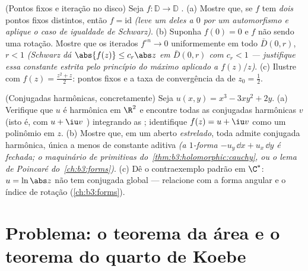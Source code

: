 \begin{exercise}[$\star\star$]\label{exo:b3:conformal:11}
(Pontos fixos e iteração no disco) Seja $f\colon\mathbb
D \to \mathbb D$ .
(a) Mostre que, se $f$ tem \emph{dois} pontos fixos distintos, então
$f = \mathrm{id}$ \emph{(leve um deles a $0$ por um automorfismo e aplique o caso
de igualdade de Schwarz)}.
(b) Suponha $f(0) = 0$ e $f$ não sendo uma rotação. Mostre que os iterados
$f^{\circ n} \to 0$ uniformemente em todo  $\bar D(0, r)$, $r < 1$ \emph{(Schwarz dá
$\abs{f(z)}
\leq c_r\abs z$ em $\bar D(0,r)$ com $c_r < 1$ --- justifique essa constante estrita pelo
princípio do máximo aplicado a $f(z)/z$)}.
(c) Ilustre com $f(z) = \frac{z^2 + z}2$: pontos fixos e a taxa de convergência da 
de $z_0 =
\frac12$.
\end{exercise}

\begin{exercise}[$\star\star$]\label{exo:b3:conformal:12}
(Conjugadas harmônicas, concretamente) Seja $u(x, y) = x^3 - 3xy^2
+ 2y$.
(a) Verifique que $u$ é harmônica em $\R^2$ e encontre todas as
conjugadas harmônicas $v$ (isto é, com $u + \iu v$ ) integrando
as ; identifique $f(z) =
u + \iu v$ como um polinômio em
$z$.
(b) Mostre que, em um aberto \emph{estrelado}, toda 
admite conjugada harmônica, única a menos de constante aditiva
\emph{(a $1$-forma $-u_y\,\dd x +
u_x\,\dd y$ é fechada; o maquinário de primitivas
do~\cref{thm:b3:holomorphic:cauchy}, ou o lema de Poincaré do~\cref{ch:b3:forms})}.
(c) Dê o contraexemplo padrão em $\C^*$: $u = \ln\abs z$ não tem conjugada
global --- relacione com a forma angular e o índice de rotação
(\cref{ch:b3:forms}).
\end{exercise}

\section{Problema: o teorema da área e o teorema do quarto de Koebe}

